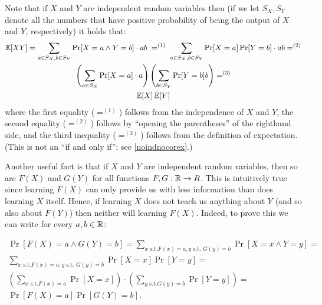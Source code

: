 Note that if \(X\) and \(Y\) are independent random variables then (if
we let \(S_X,S_Y\) denote all the numbers that have positive probability
of being the output of \(X\) and \(Y\), respectively) it holds that:
\begin{equation*}

\begin{gathered}
\E[ \ensuremath{\mathit{XY}} ] = \sum_{a \in S_X,b \in S_Y} {\textstyle\Pr[X=a \wedge Y=b]}\cdot ab \; =^{(1)} \; \sum_{a \in S_X,b \in S_Y} {\textstyle \Pr[X=a]\Pr[Y=b]}\cdot ab =^{(2)} \\
\left(\sum_{a \in S_X} {\textstyle \Pr[X=a]}\cdot a\right)\left(\sum_{b \in S_Y} {\textstyle \Pr[Y=b]}b\right) =^{(3)} \\
\E[X] \E[Y]
\end{gathered}

\end{equation*}
where the first equality (\(=^{(1)}\)) follows from the independence of
\(X\) and \(Y\), the second equality (\(=^{(2)}\)) follows by ``opening
the parentheses'' of the righthand side, and the third inequality
(\(=^{(3)}\)) follows from the definition of expectation. (This is not
an ``if and only if''; see \cref{noindnocorex}.)

Another useful fact is that if \(X\) and \(Y\) are independent random
variables, then so are \(F(X)\) and \(G(Y)\) for all functions
\(F,G:{\mathbb{R}} \rightarrow R\). This is intuitively true since learning
\(F(X)\) can only provide us with less information than does learning
\(X\) itself. Hence, if learning \(X\) does not teach us anything about
\(Y\) (and so also about \(F(Y)\)) then neither will learning \(F(X)\).
Indeed, to prove this we can write for every \(a,b \in {\mathbb{R}}\):

\begin{equation*}

\begin{gathered}
\Pr[ F(X)=a \wedge G(Y)=b ] = \sum_{x \text{ s.t.} F(x)=a, y \text{ s.t. } G(y)=b} \Pr[ X=x \wedge Y=y ] = \\
\sum_{x \text{ s.t.} F(x)=a, y \text{ s.t. } G(y)=b} \Pr[ X=x ] \Pr[  Y=y ]  = \\
\left( \sum_{x \text{ s.t.} F(x)=a } \Pr[X=x ] \right) \cdot \left( \sum_{y \text{ s.t.} G(y)=b } \Pr[Y=y ] \right) = \\
\Pr[ F(X)=a] \Pr[G(Y)=b] .
\end{gathered}

\end{equation*}

